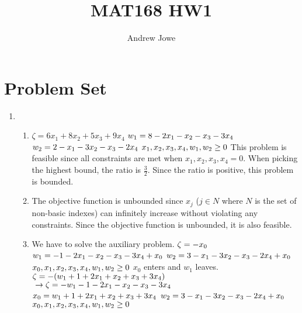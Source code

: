 \documentclass{article}
\title{MAT168 HW1}
\author{Andrew Jowe}
\begin{document}
\maketitle
\section{Problem Set}
\begin{enumerate}
    \item \begin{enumerate} [label = \roman*] %
        \item
            $\zeta = 6x_1 + 8x_2 + 5x_3 + 9x_4$
            $\\ w_1 = 8 - 2x_1 - x_2 - x_3 - 3x_4$
            $\\ w_2 = 2 - x_1 - 3x_2 - x_3 - 2x_4$
            $\\ x_1, x_2, x_3, x_4, w_1, w_2 \geq 0$
            \newline This problem is feasible since all constraints are met when $x_1, x_2, x_3, x_4 = 0$.
            \newline When picking the highest bound, the ratio is $\frac{3}{2}$. Since the ratio is positive, this problem is bounded.
        \item
            The objective function is unbounded since $x_j$ ($j \in N$ where $N$ is the set of non-basic indexes) can infinitely increase without violating any constraints. Since the objective function is unbounded, it is also feasible.
        \item 
            We have to solve the auxiliary problem.
            $\\\zeta = -x_0$
            $\\ w_1 = - 1 - 2x_1 - x_2 - x_3 - 3x_4 + x_0$
            $\\ w_2 = 3 - x_1 - 3x_2 - x_3 - 2x_4 + x_0$
            $\\ x_0, x_1, x_2, x_3, x_4, w_1, w_2 \geq 0$
            \newline $x_0$ enters and $w_1$ leaves.
            $\\\zeta = -(w_1 + 1 + 2x_1 + x_2 + x_3 + 3x_4)$
            $\\\to \zeta = -w_1 - 1 - 2x_1 - x_2 - x_3 - 3x_4$
            $\\ x_0 = w_1 + 1 + 2x_1 + x_2 + x_3 + 3x_4$
            $\\ w_2 = 3 - x_1 - 3x_2 - x_3 - 2x_4 + x_0$
            $\\ x_0, x_1, x_2, x_3, x_4, w_1, w_2 \geq 0$

\end{enumerate}
\end{enumerate}
\end{document}

